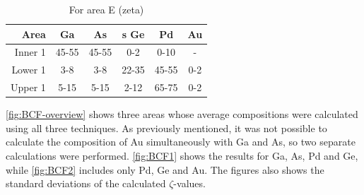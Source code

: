 \begin{table}[h]
	\caption{For area E (zeta)}
	\begin{center}
		\begin{tabular}{r|ccccc}			
			Area & Ga & As &s Ge & Pd & Au\\ 
			\midrule
			\hline
			Inner 1& 45-55 & 45-55 & 0-2 & 0-10 & -\\
			Lower 1& 3-8 & 3-8 & 22-35 & 45-55 & 0-2\\
			Upper 1& 5-15 & 5-15 & 2-12 & 65-75 & 0-2\\
			\hline
		\end{tabular} 
	\end{center}
	\label{tab:E-composition}
\end{table}


\cref{fig:BCF-overview} shows three areas whose average compositions were calculated using all three techniques. As previously mentioned, it was not possible to calculate the composition of Au simultaneously with Ga and As, so two separate calculations were performed. \cref{fig:BCF1} shows the results for Ga, As, Pd and Ge, while \cref{fig:BCF2} includes only Pd, Ge and Au. The figures also shows the standard deviations of the calculated $\zeta$-values.

